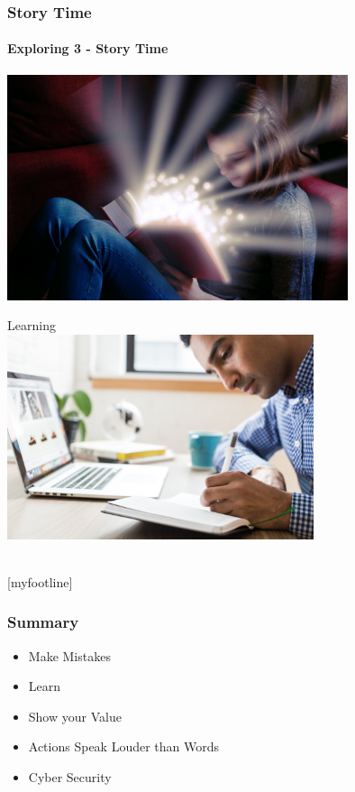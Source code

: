 \documentclass[aspectratio=169]{beamer}
\begin{document}
\begin{frame}
  \frametitle{Story Time}
  \framesubtitle{Exploring 3 - Story Time}
  \begin{center}
    \includegraphics[width=10cm,keepaspectratio]{story_time}
  \end{center}
\end{frame}


\begin{frame}[t]
  \begin{center}
    \begingroup
    \fontsize{20pt}{20pt}\selectfont
    Learning \\
    \endgroup
    \bigskip
    \includegraphics[width=9cm,keepaspectratio]{learning} \\
    \bigskip
    \inserttitle \\
  \end{center}
\end{frame}

[myfootline]

\begin{frame}
  \frametitle{Summary}
  \begin{itemize}
  \item{Make Mistakes}
  \item{Learn}
  \item{Show your Value}
  \item{Actions Speak Louder than Words}
  \item{Cyber Security}
  \end{itemize}
\end{frame}
\end{document}
